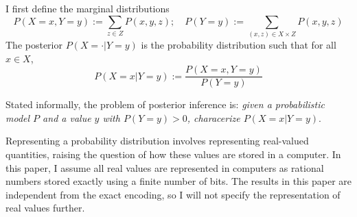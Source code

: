 \documentclass{article}
\theoremstyle{definition}
\theoremstyle{remark}
\begin{document}
I first define the marginal distributions
$$
P(X = x, Y = y) := \sum_{z \in Z} P(x, y, z); \quad P(Y = y) := \sum_{(x, z) \in X \times Z} P(x, y, z)
$$
The posterior $P(X = \cdot | Y = y)$ is the probability distribution such that for all $x \in X$,
$$
P(X = x | Y = y) := \frac{P(X = x, Y = y)}{P(Y = y)}
$$

Stated informally, the problem of posterior inference is:
\textit{given a probabilistic model $P$ and a value $y$ with $P(Y = y) > 0$, characerize $P(X = x | Y = y)$}.

Representing a probability distribution involves representing real-valued quantities, raising the question of how these values are stored in a computer.
In this paper, I assume all real values are represented in computers as rational numbers stored exactly using a finite number of bits.
The results in this paper are independent from the exact encoding, so I will not specify the representation of real values further.
\end{document}
